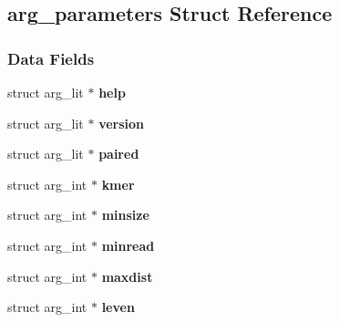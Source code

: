\hypertarget{structarg__parameters}{}\subsection{arg\+\_\+parameters Struct Reference}
\label{structarg__parameters}
\subsubsection*{Data Fields}
\begin{DoxyCompactItemize}
\item 
\mbox{\label{structarg__parameters_ac1e8a158dfe54b7fdc2f851dd5b5ffcd}} 
struct arg\+\_\+lit $\ast$ {\bfseries help}
\item 
\mbox{\label{structarg__parameters_a198a8b119bc48b6f99b8e6ceb78f7a4d}} 
struct arg\+\_\+lit $\ast$ {\bfseries version}
\item 
\mbox{\label{structarg__parameters_a0b26ccbd70ba274a29180ed1e352799d}} 
struct arg\+\_\+lit $\ast$ {\bfseries paired}
\item 
\mbox{\label{structarg__parameters_ad26635309054e57c2d10e850c1764f81}} 
struct arg\+\_\+int $\ast$ {\bfseries kmer}
\item 
\mbox{\label{structarg__parameters_a0412f10a83243845b3ffd5d6d1ab1aac}} 
struct arg\+\_\+int $\ast$ {\bfseries minsize}
\item 
\mbox{\label{structarg__parameters_a18c392342b0193fd018d637ede10e5b6}} 
struct arg\+\_\+int $\ast$ {\bfseries minread}
\item 
\mbox{\label{structarg__parameters_a203c47970b46af9803bd713e70ce52f9}} 
struct arg\+\_\+int $\ast$ {\bfseries maxdist}
\item 
\mbox{\label{structarg__parameters_a99c983b516df658a43b37ce3151cda42}} 
struct arg\+\_\+int $\ast$ {\bfseries leven}
\item 
\mbox{\label{structarg__parameters_a7adce1a839844f6fb0fc792dbdd78736}} 

\end{DoxyCompactItemize}
